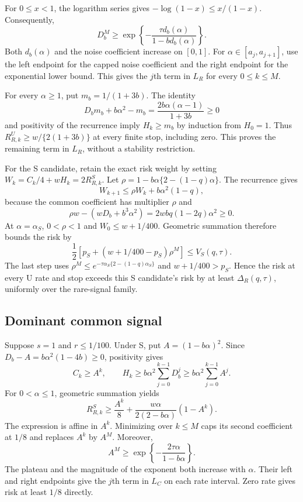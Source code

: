 \documentclass{alt2027}
\begin{document}
For $0 \leq x < 1$, the logarithm series gives $-\log(1 - x) \leq x/(1 - x)$.
Consequently,
\[
  D_b^M \geq \exp\left\{ -\frac{\tau d_b(\alpha)}
                                      {1 - bd_b(\alpha)} \right\}.
\]
Both $d_b(\alpha)$ and the noise coefficient increase on $[0,1]$. For
$\alpha \in[a_j,a_{j+1}]$, use the left endpoint for the capped noise
coefficient and the right endpoint for the exponential lower bound. This gives
the $j$th term in $L_R$ for every $0 \leq k \leq M$.

For every $\alpha \geq 1$, put $m_b = 1/(1 + 3b)$. The identity
\[
  D_bm_b + b\alpha^2 - m_b = \frac{2b\alpha(\alpha - 1)}{1 + 3b} \geq 0
\]
and positivity of the recurrence imply $H_k \geq m_b$ by induction from
$H_0 = 1$. Thus $R_{R,k}^U \geq w/\{2(1 + 3b)\}$ at every finite stop, including
zero. This proves the remaining term in $L_R$, without a stability restriction.

For the S candidate, retain the exact risk weight by setting
$W_k = C_k/4 + wH_k = 2R_{R,k}^S$. Let
$\rho = 1 - b\alpha\{2 - (1 - q)\alpha\}$. The recurrence gives
\[
  W_{k+1} \leq \rho W_k + b\alpha^2(1 - q),
\]
because the common coefficient has multiplier $\rho$ and
\[
  \rho w - (wD_b + b^3\alpha^2) = 2wbq(1 - 2q)\alpha^2 \geq 0.
\]
At $\alpha = \alpha_S$, $0 < \rho < 1$ and $W_0 \leq w + 1/400$. Geometric
summation therefore bounds the risk by
\[
  \frac12\left[ p_S + (w + 1/400 - p_S)\rho^M \right] \leq V_S(q,\tau).
\]
The last step uses $\rho^M \leq e^{-\tau\alpha_S\{2-(1-q)\alpha_S\}}$ and
$w + 1/400 > p_S$. Hence the risk at every U rate and stop exceeds this S
candidate's risk by at least $\Delta_R(q,\tau)$, uniformly over the rare-signal
family.

\subsection{Dominant common signal}

Suppose $s = 1$ and $r \leq 1/100$. Under S, put $A = (1 - b\alpha)^2$. Since
$D_b - A = b\alpha^2(1 - 4b) \geq 0$, positivity gives
\[
  C_k \geq A^k,\qquad H_k
      \geq b\alpha^2\sum_{j=0}^{k-1}D_b^j
      \geq b\alpha^2\sum_{j=0}^{k-1}A^j.
\]
For $0 < \alpha \leq 1$, geometric summation yields
\[
  R_{R,k}^S \geq \frac{A^k}{8} + \frac{w\alpha}{2(2 - b\alpha)}(1 - A^k).
\]
The expression is affine in $A^k$. Minimizing over $k \leq M$ caps its second
coefficient at $1/8$ and replaces $A^k$ by $A^M$. Moreover,
\[
  A^M \geq \exp\left\{ -\frac{2\tau\alpha}{1 - b\alpha} \right\}.
\]
The plateau and the magnitude of the exponent both increase with $\alpha$. Their
left and right endpoints give the $j$th term in $L_C$ on each rate interval.
Zero rate gives risk at least $1/8$ directly.
\end{document}
